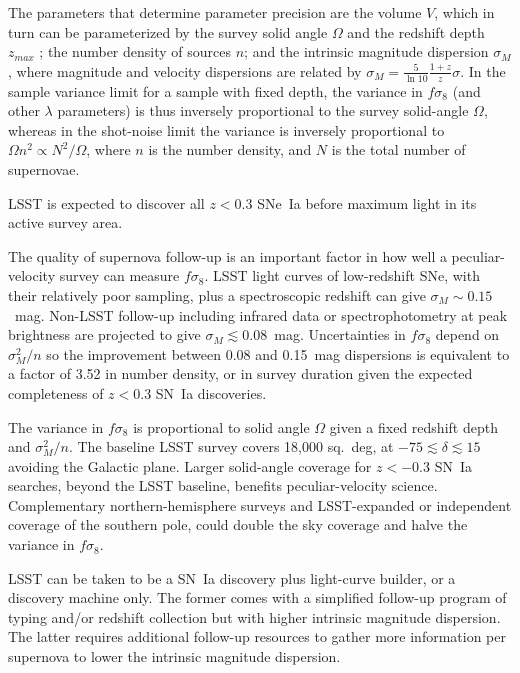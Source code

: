 \documentclass{aastex62}   	%
\begin{document}
The parameters that determine parameter precision are the volume $V$, which
in turn can be parameterized by the survey solid angle $\Omega$ and the redshift depth $z_{max}$ ; the number density of sources $n$; and the intrinsic
magnitude dispersion $\sigma_M$, where magnitude and velocity dispersions are related by $\sigma_{M} = \frac{5}{\ln{10}} \frac{1+z}{z} \sigma$.
In the sample variance limit for a sample with fixed depth, the variance in $f\sigma_8$ (and other $\lambda$ parameters)
is thus inversely proportional to the survey solid-angle $\Omega$, whereas
in the shot-noise limit the variance is inversely proportional to $\Omega n^2 \propto N^2/\Omega$, where $n$ is the number density,
and $N$ is the total number of supernovae.  

LSST is expected to discover all $z<0.3$ SNe~Ia before maximum light in its active survey area.

The quality of supernova follow-up is an important factor in how well a peculiar-velocity survey can measure $f\sigma_8$.
LSST light curves of low-redshift SNe, with their relatively poor sampling, plus a spectroscopic redshift
 can give $\sigma_M \sim 0.15$~mag. Non-LSST follow-up including infrared data or spectrophotometry at peak brightness are projected to give
$\sigma_M \lesssim 0.08$~mag.
Uncertainties in $f\sigma_8$ depend on $\sigma^2_M/n$ so the improvement between 0.08 and 0.15~mag dispersions is equivalent to a factor of 3.52
 in number density, or in survey duration given the expected completeness of $z<0.3$ SN~Ia discoveries.

The variance in $f\sigma_8$ is proportional to solid angle $\Omega$ given a fixed redshift depth and  $\sigma^2_M/n$.  The baseline
LSST survey covers 18,000 sq.~deg, at $-75 \lesssim \delta \lesssim15$ avoiding the Galactic plane.  Larger solid-angle coverage for $z<-0.3$ SN~Ia searches, beyond
the LSST baseline, benefits peculiar-velocity science.  Complementary northern-hemisphere surveys and LSST-expanded or independent
coverage of the southern pole, could double
the sky coverage and halve the variance in $f\sigma_8$.

LSST can be taken to be a SN~Ia discovery plus light-curve builder, or a discovery machine only.  The former comes with a simplified follow-up program of typing
and/or redshift collection but with higher intrinsic magnitude dispersion.  The latter requires additional follow-up resources to gather more information per supernova to
lower the intrinsic magnitude dispersion.

\appendix
\end{document}
